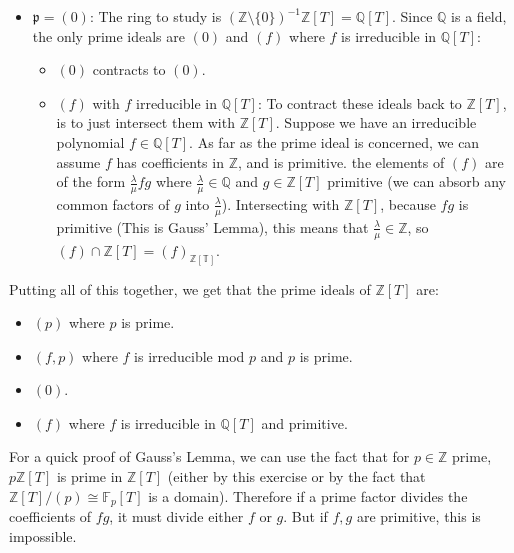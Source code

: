 \begin{problem}
\begin{sol}
\begin{itemize}
        \item  $\mathfrak{p} = (0)$: The ring to study is
        $(\mathbb{Z} \setminus \{0\})^{-1} \mathbb{Z}[T] = \mathbb{Q}[T]$.
        Since $\mathbb{Q}$ is a field, the only prime ideals are $(0)$ and $(f)$ where $f$ is irreducible in $\mathbb{Q}[T]$:
        \begin{itemize}
            \item $(0)$ contracts to $(0)$.
            \item $(f)$ with $f$ irreducible in $\mathbb{Q}[T]$:
            To contract these ideals back to $\mathbb{Z}[T]$,
            is to just intersect them with $\mathbb{Z}[T]$.
            Suppose we have an irreducible polynomial $f \in \mathbb{Q}[T]$.
            As far as the prime ideal is concerned, we can assume $f$
            has coefficients in $\mathbb{Z}$, and is primitive.
            the elements of $(f)$ are of the form $\frac{\lambda}{\mu}fg$
            where $\frac{\lambda}{\mu} \in \mathbb{Q}$ and $g \in \mathbb{Z}[T]$ primitive
            (we can absorb any common factors of $g$ into $\frac{\lambda}{\mu}$).
            Intersecting with $\mathbb{Z}[T]$, because $fg$ is primitive (This is Gauss' Lemma),
            this means that $\frac{\lambda}{\mu} \in \mathbb{Z}$,
            so $(f) \cap \mathbb{Z}[T] = (f)_{\mathbb{Z[T]}}$.
        \end{itemize}
    \end{itemize}

    Putting all of this together, we get that the prime ideals of $\mathbb{Z}[T]$ are:
    \begin{itemize}
        \item $(p)$ where $p$ is prime.
        \item $(f, p)$ where $f$ is irreducible mod $p$ and $p$ is prime.
        \item $(0)$.
        \item $(f)$ where $f$ is irreducible in $\mathbb{Q}[T]$ and primitive.
    \end{itemize}
    For a quick proof of Gauss's Lemma, we can use the fact that for $p \in \mathbb{Z}$ prime, $p\mathbb{Z}[T]$ is prime in $\mathbb{Z}[T]$
    (either by this exercise or by the fact that $\mathbb{Z}[T]/(p) \cong \mathbb{F}_p[T]$ is a domain).
    Therefore if a prime factor divides the coefficients of $fg$, it must divide either $f$ or $g$.
    But if $f, g$ are primitive, this is impossible.



\end{sol}
\end{problem}
